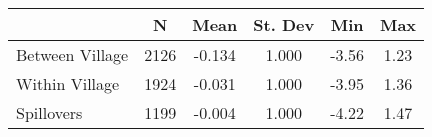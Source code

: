 \begin{tabular}{l*{5}{c}}\hline&\multicolumn{1}{c}{N}&\multicolumn{1}{c}{Mean}&\multicolumn{1}{c}{St. Dev}&\multicolumn{1}{c}{Min}&\multicolumn{1}{c}{Max}\\ \hline 
Between Village & 2126 & -0.134 & 1.000 & -3.56 & 1.23 \\
Within Village & 1924 & -0.031 & 1.000 & -3.95 & 1.36 \\
Spillovers & 1199 & -0.004 & 1.000 & -4.22 & 1.47 \\
\hline \end{tabular}
